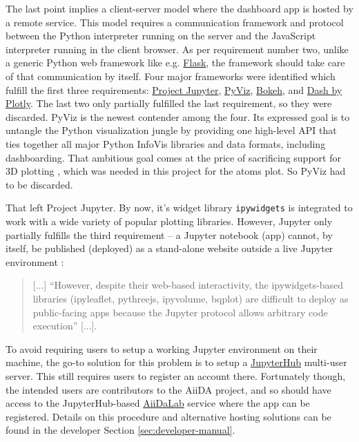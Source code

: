 The last point implies a client-server model where the dashboard app is hosted
by a remote service. This model requires a communication framework and protocol
between the Python interpreter running on the server and the JavaScript
interpreter running in the client browser. As per requirement number two, unlike
a generic Python web framework like e.g. \href{http://flask.pocoo.org/}{Flask},
the framework should take care of that communication by itself. Four major
frameworks were identified which fulfill the first three requirements:
\href{https://jupyter.org/}{Project Jupyter}, \href{http://pyviz.org/}{PyViz},
\href{https://bokeh.pydata.org/en/latest/}{Bokeh}, and
\href{https://plot.ly/products/dash/}{Dash by Plotly}. The last two only
partially fulfilled the last requirement, so they were discarded. PyViz is the
newest contender among the four. Its expressed goal is to untangle the Python
visualization jungle by providing one high-level API that ties together all
major Python InfoVis libraries and data formats, including dashboarding. That
ambitious goal comes at the price of sacrificing support for 3D plotting
\cite{pyviz-faq}, which was needed in this project for the atoms plot. So PyViz
had to be discarded.

That left Project Jupyter. By now, it's widget library \texttt{ipywidgets} is
integrated to work with a wide variety of popular plotting libraries. However,
Jupyter only partially fulfills the third requirement -- a Jupyter notebook
(app) cannot, by itself, be published (deployed) as a stand-alone website
outside a live Jupyter environment \cite{python-viz-2018}:

\begin{quote}
    [...] ``However, despite their web-based interactivity, the ipywidgets-based
    libraries (ipyleaflet, pythreejs, ipyvolume, bqplot) are difficult to deploy
    as public-facing apps because the Jupyter protocol allows arbitrary code
    execution'' [...].
\end{quote}

To avoid requiring users to setup a working Jupyter environment on their
machine, the go-to solution for this problem is to setup a
\href{https://jupyter.org/hub}{JupyterHub} multi-user server. This still
requires users to register an account there. Fortunately though, the intended
users are contributors to the AiiDA project, and so should have access to the
JupyterHub-based \href{ https://aiidalab.materialscloud.org/}{AiiDaLab} service
where the app can be registered. Details on this procedure and alternative
hosting solutions can be found in the developer Section
\vref{sec:developer-manual}.



